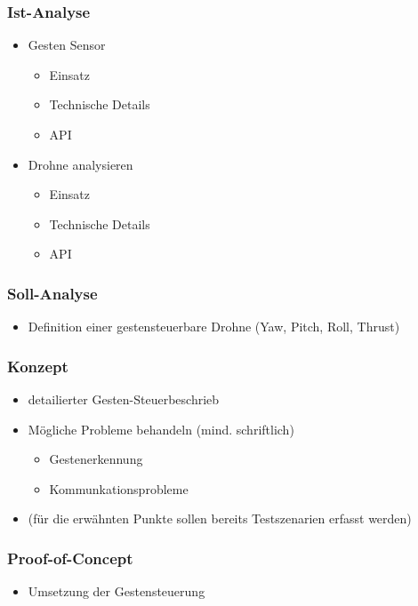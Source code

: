 \subsubsection{Ist-Analyse}
\begin{itemize}
	\item Gesten Sensor
	\begin{itemize}
		\item Einsatz
		\item Technische Details
		\item API
	\end{itemize}
	
	\item Drohne analysieren
	\begin{itemize}
		\item Einsatz
		\item Technische Details
		\item API
	\end{itemize}
\end{itemize}


\subsubsection{Soll-Analyse}
\begin{itemize}
	\item Definition einer gestensteuerbare Drohne (Yaw, Pitch, Roll, Thrust)
\end{itemize}


\subsubsection{Konzept}
\begin{itemize}
	\item detailierter Gesten-Steuerbeschrieb
	\item Mögliche Probleme behandeln (mind. schriftlich)
	\begin{itemize}
		\item Gestenerkennung
		\item Kommunkationsprobleme
	\end{itemize}
	\item (für die erwähnten Punkte sollen bereits Testszenarien erfasst werden)
\end{itemize}


\subsubsection{Proof-of-Concept}
\begin{itemize}
	\item Umsetzung der Gestensteuerung
\end{itemize}


